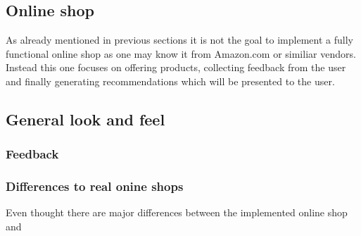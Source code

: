 
\subsection{Online shop}
As already mentioned in previous sections it is not the goal to implement a fully functional online shop as one may know it from Amazon.com or similiar vendors.
Instead this one focuses on offering products, collecting feedback from the user and finally generating recommendations which will be presented to the user.

\subsection{General look and feel}

\subsubsection{Feedback}


\subsubsection{Differences to real onine shops}
Even thought there are major differences between the implemented online shop and

